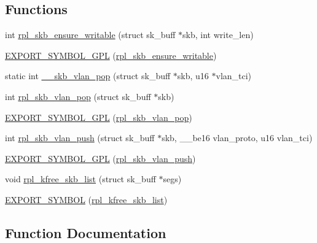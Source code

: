\subsection*{Functions}
\begin{DoxyCompactItemize}
\item 
int \hyperlink{compat_2skbuff-openvswitch_8c_a15c9dad54898a1483b0c61101836ae4b}{rpl\+\_\+skb\+\_\+ensure\+\_\+writable} (struct sk\+\_\+buff $\ast$skb, int write\+\_\+len)
\item 
\hyperlink{compat_2skbuff-openvswitch_8c_a7ff7437b21b29dfb4e9dc4c4a2c1a5ea}{E\+X\+P\+O\+R\+T\+\_\+\+S\+Y\+M\+B\+O\+L\+\_\+\+G\+P\+L} (\hyperlink{skbuff-openvswitch_8c_a15c9dad54898a1483b0c61101836ae4b}{rpl\+\_\+skb\+\_\+ensure\+\_\+writable})
\item 
static int \hyperlink{compat_2skbuff-openvswitch_8c_a0f57a812e220d03f4a3a57604edfd079}{\+\_\+\+\_\+skb\+\_\+vlan\+\_\+pop} (struct sk\+\_\+buff $\ast$skb, u16 $\ast$vlan\+\_\+tci)
\item 
int \hyperlink{compat_2skbuff-openvswitch_8c_a797322c61b7d5999237ffdd59972751e}{rpl\+\_\+skb\+\_\+vlan\+\_\+pop} (struct sk\+\_\+buff $\ast$skb)
\item 
\hyperlink{compat_2skbuff-openvswitch_8c_aa16324b61c50ddbb2615a482ccd2cfc8}{E\+X\+P\+O\+R\+T\+\_\+\+S\+Y\+M\+B\+O\+L\+\_\+\+G\+P\+L} (\hyperlink{skbuff-openvswitch_8c_a797322c61b7d5999237ffdd59972751e}{rpl\+\_\+skb\+\_\+vlan\+\_\+pop})
\item 
int \hyperlink{compat_2skbuff-openvswitch_8c_ad4f8c18bdd22cdd3623de896458c404e}{rpl\+\_\+skb\+\_\+vlan\+\_\+push} (struct sk\+\_\+buff $\ast$skb, \+\_\+\+\_\+be16 vlan\+\_\+proto, u16 vlan\+\_\+tci)
\item 
\hyperlink{compat_2skbuff-openvswitch_8c_a0139a89a512cfd5b8aa405c2d49f0e85}{E\+X\+P\+O\+R\+T\+\_\+\+S\+Y\+M\+B\+O\+L\+\_\+\+G\+P\+L} (\hyperlink{skbuff-openvswitch_8c_ad4f8c18bdd22cdd3623de896458c404e}{rpl\+\_\+skb\+\_\+vlan\+\_\+push})
\item 
void \hyperlink{compat_2skbuff-openvswitch_8c_a23942601601684adfd86854f195244f3}{rpl\+\_\+kfree\+\_\+skb\+\_\+list} (struct sk\+\_\+buff $\ast$segs)
\item 
\hyperlink{compat_2skbuff-openvswitch_8c_ac2d4948230ea7306d2789e0e783241e7}{E\+X\+P\+O\+R\+T\+\_\+\+S\+Y\+M\+B\+O\+L} (\hyperlink{skbuff-openvswitch_8c_a23942601601684adfd86854f195244f3}{rpl\+\_\+kfree\+\_\+skb\+\_\+list})
\end{DoxyCompactItemize}


\subsection{Function Documentation}
\hypertarget{compat_2skbuff-openvswitch_8c_a0f57a812e220d03f4a3a57604edfd079}{}
